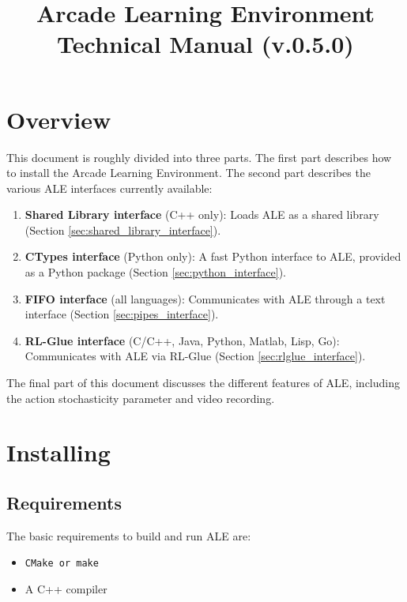 \documentclass[12pt]{article}
\title{Arcade Learning Environment\\ Technical Manual (v.0.5.0)}
\author{}
\begin{document}
\maketitle

\clearpage

\tableofcontents

\clearpage

\section{Overview}

This document is roughly divided into three parts. The first part describes how to install the Arcade Learning Environment. The second part describes the various ALE interfaces currently available: 
\begin{enumerate}
  \item \textbf{Shared Library interface} (C++ only): Loads ALE as a shared library (Section 
  \ref{sec:shared_library_interface}).
  \item \textbf{CTypes interface} (Python only): A fast Python interface to ALE, provided as a Python package (Section \ref{sec:python_interface}).
  \item \textbf{FIFO interface} (all languages): Communicates with ALE through a text interface (Section \ref{sec:pipes_interface}).
  \item \textbf{RL-Glue interface} (C/C++, Java, Python, Matlab, Lisp, Go): Communicates with ALE via RL-Glue (Section \ref{sec:rlglue_interface}).
\end{enumerate}
The final part of this document discusses the different features of ALE, including the action stochasticity parameter and video recording.

\section{Installing}\label{sec:install}

\subsection{Requirements}

The basic requirements to build and run ALE are:

\begin{itemize}
  \item \verb+CMake or make+
  \item A C++ compiler
\end{itemize}
\end{document}
